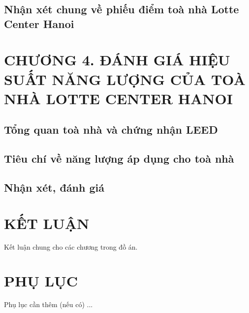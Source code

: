 \documentclass{thesis}
\begin{document}
\subsection{Nhận xét chung về phiếu điểm toà nhà Lotte Center Hanoi}

\newpage

\section*{CHƯƠNG 4. ĐÁNH GIÁ HIỆU SUẤT NĂNG LƯỢNG CỦA TOÀ NHÀ LOTTE
CENTER HANOI}
{} %

\setcounter{section}{4}
\setcounter{subsection}{0}
\setcounter{figure}{0}
\setcounter{table}{0}

\subsection{Tổng quan toà nhà và chứng nhận LEED}
\subsection{Tiêu chí về năng lượng áp dụng cho toà nhà}
\subsection{Nhận xét, đánh giá}

\newpage

\section*{KẾT LUẬN}

Kết luận chung cho các chương trong đồ án.

\newpage



\newpage

\section*{PHỤ LỤC}

Phụ lục cần thêm (nếu có)
...
\end{document}
